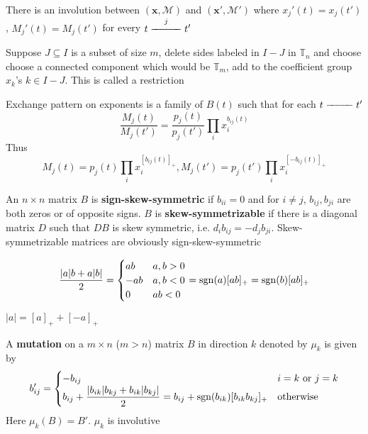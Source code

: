 \documentclass[main]{subfiles}
\begin{document}
\begin{definition}
There is an involution between $(\mathbf{x},\mathcal M)$ and $(\mathbf{x'},\mathcal M')$ where $x_j'(t)=x_j(t')$, $M_j'(t)=M_j(t')$ for every $t\xedge jt'$
\end{definition}

\begin{definition}
Suppose $J\subseteq I$ is a subset of size $m$, delete sides labeled in $I-J$ in $\mathbb T_n$ and choose choose a connected component which would be $\mathbb T_m$, add to the coefficient group $x_k$'s $k\in I-J$. This is called a restriction
\end{definition}

\begin{definition}
Exchange pattern on exponents is a family of $B(t)$ such that for each $t\xedge{\medskip}t'$
\[\frac{M_j(t)}{M_j(t')}=\frac{p_j(t)}{p_j(t')}\prod_ix_i^{b_{ij}(t)}\]
Thus
\[M_j(t)=p_j(t)\prod_ix_i^{[b_{ij}(t)]_+},M_j(t')=p_j(t')\prod_ix_i^{[-b_{ij}(t)]_+}\]
\end{definition}

\begin{definition}
An $n\times n$ matrix $B$ is \textbf{sign-skew-symmetric} if $b_{ii}=0$ and for $i\neq j$, $b_{ij},b_{ji}$ are both zeros or of opposite signs. $B$ is \textbf{skew-symmetrizable} if there is a diagonal matrix $D$ such that $DB$ is skew symmetric, i.e. $d_ib_{ij}=-d_jb_{ji}$. Skew-symmetrizable matrices are obviously sign-skew-symmetric
\end{definition}

\begin{lemma}\label{Lemma on (|a|b+a|b|)/2}
\begin{align*}
\frac{|a|b+a|b|}{2}=\begin{cases}
ab&a,b>0 \\
-ab&a,b<0 \\
0&ab<0
\end{cases}=\operatorname{sgn}(a)[ab]_+=\operatorname{sgn}(b)[ab]_+
\end{align*}
\end{lemma}

\begin{note}
$|a|=[a]_++[-a]_+$
\end{note}

\begin{definition}
A \textbf{mutation} on a $m\times n$ ($m>n$) matrix $B$ in direction $k$ denoted by $\mu_k$ is given by
\begin{align*}
b_{ij}'=\begin{cases}
-b_{ij}&i=k\text{ or }j=k \\
b_{ij}+\dfrac{|b_{ik}|b_{kj}+b_{ik}|b_{kj}|}{2}=b_{ij}+\operatorname{sgn}(b_{ik})[b_{ik}b_{kj}]_+&\text{otherwise}
\end{cases}
\end{align*}
Here $\mu_k(B)=B'$. $\mu_k$ is involutive
\end{definition}
\end{document}
